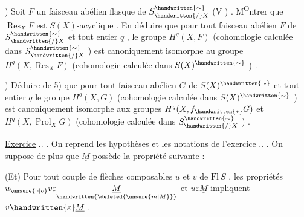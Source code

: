) Soit \(F\) un faisceau abélien flasque de \(S^{\handwritten{\sim}}_{\handwritten{/}X}\) (V ) . M\textsuperscript{O}ntrer que \(\operatorname{Res}_X F\) est \(S(X)\)-acyclique%
\reversemarginpar{}\normalmarginpar . En déduire que pour tout faisceau abélien \(F\) de \(S^{\handwritten{\sim}}_{\handwritten{/}X}\) et tout entier \(q\) , le groupe \(H^q(X,F)\) (cohomologie calculée dans \(S^{\handwritten{\sim}}_{\handwritten{/}X}\) ) est canoniquement isomorphe au groupe \(H^q(X,\operatorname{Res}_X F)\) (cohomologie calculée dans \(S(X)^{\handwritten{\sim}}\) ) .

) Déduire de 5) que pour tout faisceau abélien \(G\)  de \(S(X)^{\handwritten{\sim}}\) et tout entier \(q\) le groupe \(H^q(X,G)\)  (cohomologie calculée dans \(S(X)^{\handwritten{\sim}}\) ) est canoniquement isomorphe aux groupes \(H^q(X,f_{\handwritten{*}}G)\) et \(H^q(X,\operatorname{Prol}_X G)\) (cohomologie calculée dans \(S^{\handwritten{\sim}}_{\handwritten{/}X}\) ) .

\uline{Exercice} .. . On reprend les hypothèses et les notations de l'exercice .. . On suppose de plus que \(\underline{M}\) possède la propriété suivante :

(Et) Pour tout couple de flèches composables \(u\) et \(v\) de \(\mathrm{Fl}\ S\) , les  propriétés \(u_{\unsure{\circ|o}}v\varepsilon\underset{\handwritten{\deleted{\unsure{m|M}}}}{\underline{M}}\) et \(u\varepsilon\underline{M}\) impliquent \(v\handwritten{\varepsilon}\underline{M}\) .

